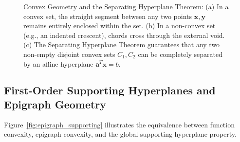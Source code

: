\begin{figure}[htbp]
\caption{Convex Geometry and the Separating Hyperplane Theorem: (a) In a convex set, the straight segment between any two points $\mathbf{x}, \mathbf{y}$ remains entirely enclosed within the set. (b) In a non-convex set (e.g., an indented crescent), chords cross through the external void. (c) The Separating Hyperplane Theorem guarantees that any two non-empty disjoint convex sets $C_1, C_2$ can be completely separated by an affine hyperplane $\mathbf{a}^T\mathbf{x} = b$.}
\label{fig:convex_sets_separation}
\end{figure}

\subsection{First-Order Supporting Hyperplanes and Epigraph Geometry}
Figure~\ref{fig:epigraph_supporting} illustrates the equivalence between function convexity, epigraph convexity, and the global supporting hyperplane property.

